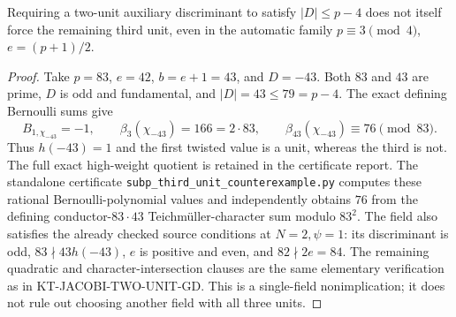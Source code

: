 \begin{proposition}
Requiring a two-unit auxiliary discriminant to satisfy $|D|\leq p-4$
does not itself force the remaining third unit, even in the automatic
family $p\equiv3\pmod4$, $e=(p+1)/2$.
\end{proposition}
\begin{proof}
Take $p=83$, $e=42$, $b=e+1=43$, and $D=-43$.  Both $83$ and $43$
are prime, $D$ is odd and fundamental, and $|D|=43\leq79=p-4$.
The exact defining Bernoulli sums give
\[
 B_{1,\chi_{-43}}=-1,\qquad
 \beta_3(\chi_{-43})=166=2\cdot83,
 \qquad \beta_{43}(\chi_{-43})\equiv76\pmod{83}.
\]
Thus $h(-43)=1$ and the first twisted value is a unit, whereas the
third is not.  The full exact high-weight quotient is retained in the
certificate report.
The standalone certificate
\texttt{subp\_third\_unit\_counterexample.py} computes these rational
Bernoulli-polynomial values and independently obtains $76$ from the
defining conductor-$83\cdot43$ Teichm\"uller-character sum modulo $83^2$.
The field also satisfies the already checked source conditions at
$N=2,\psi=1$: its discriminant is odd, $83\nmid43h(-43)$, $e$ is
positive and even, and $82\nmid2e=84$.  The remaining quadratic and
character-intersection clauses are the same elementary verification
as in KT-JACOBI-TWO-UNIT-GD.  This is a single-field nonimplication;
it does not rule out choosing another field with all three units.
\end{proof}
